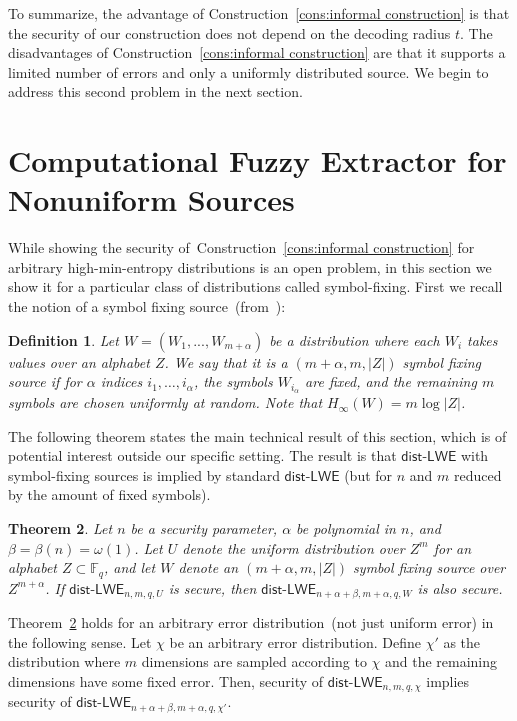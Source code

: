 \documentclass[11pt]{article}
\newcommand{\thref}[1]{\mbox{Theorem~\ref{#1}}}
\newcommand{\consref}[1]{\mbox{Construction~\ref{#1}}}
\newcommand{\class}[1]{{\ensuremath{\mathsf{#1}}}}
\newcommand{\Fq}{\ensuremath{\mathbb{F}_q}}
\newcommand{\distLWE}{\ensuremath{\class{dist\mbox{-}LWE}}}
\newtheorem{theorem}{Theorem}[section]
\newtheorem{definition}[theorem]{Definition}
\begin{document}
To summarize, the advantage of \consref{cons:informal construction} is that the security of our construction does not depend on the decoding radius $t$.  
The disadvantages of \consref{cons:informal construction} are that it supports a limited number of errors and only a uniformly distributed source.  We begin to address this second problem in the next section.

\section{Computational Fuzzy Extractor for Nonuniform Sources}
\label{sec:LWE block fixing sources}
While showing the security of~\consref{cons:informal construction} for arbitrary high-min-entropy distributions is an open problem, in this section we show it for a particular class of distributions called symbol-fixing.  First we recall the notion of a symbol fixing source~(from~\cite[Definition 2.3]{KZ07}): 
\begin{definition}
Let $W = (W_1,..., W_{m+\alpha})$ be a distribution where each $W_i$ takes values over an alphabet $Z$.  We say that it is a $(m+
\alpha, m, |Z|) $ \emph{symbol fixing source} if for $\alpha$ indices $i_1, \dots, i_\alpha$, the symbols $W_{i_\alpha}$ are fixed, and the remaining $m$  symbols are chosen uniformly at random.  Note that $H_\infty(W)=m\log |Z|$.
\end{definition}

The following theorem states the main technical result of this section, which is of potential interest outside our specific setting. The result is that $\distLWE$ with symbol-fixing sources is implied by standard $\distLWE$ (but for $n$ and $m$ reduced by the amount of fixed symbols).
\begin{theorem}
\label{thm:blockLWE}
Let $n$ be a security parameter, $\alpha$ be polynomial in $n$, and $\beta=\beta(n)=\omega(1)$.
Let $U$ denote the uniform distribution over $Z^m$ for an alphabet $Z\subset \Fq$, and let $W$ denote an $(m+\alpha, m, |Z|)$ symbol fixing source over $Z^{m+\alpha}$.
If $\distLWE_{n, m,q, U}$ is secure, then $\distLWE_{n+\alpha+\beta, m+\alpha, q, W}$ is also secure.
\end{theorem}

\thref{thm:blockLWE} holds for an arbitrary error distribution~(not just uniform error) in the following sense.  Let $\chi$ be an arbitrary error distribution.  Define $\chi'$ as the distribution where $m$ dimensions are sampled according to $\chi$ and the remaining dimensions have some fixed error.  Then, security of $\distLWE_{n, m, q, \chi}$ implies security of $\distLWE_{n+\alpha+ \beta, m+\alpha, q, \chi'}$.
\end{document}
